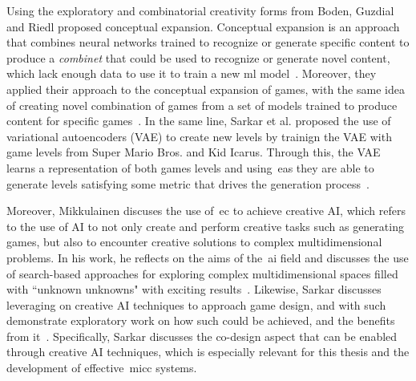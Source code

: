 Using the exploratory and combinatorial creativity forms from Boden, Guzdial and Riedl proposed conceptual expansion. Conceptual expansion is an approach that combines neural networks trained to recognize or generate specific content to produce a \textit{combinet} that could be used to recognize or generate novel content, which lack enough data to use it to train a new ml model~\cite{guzdial2018-combinets}. Moreover, they applied their approach to the conceptual expansion of games, with the same idea of creating novel combination of games from a set of models trained to produce content for specific games~\cite{guzdial2020-conceptualGameExpansion}. In the same line, Sarkar et al. proposed the use of variational autoencoders (VAE) to create new levels by trainign the VAE with game levels from Super Mario Bros. and Kid Icarus. Through this, the VAE learns a representation of both games levels and using~\acrshort{ea}s they are able to generate levels satisfying some metric that drives the generation process~\cite{sarkar2019-controllableLvlBlending}.

Moreover, Mikkulainen discuses the use of~\acrlong{ec} to achieve creative AI, which refers to the use of AI to not only create and perform creative tasks such as generating games, but also to encounter creative solutions to complex multidimensional problems. In his work, he reflects on the aims of the~\acrshort{ai} field and discusses the use of search-based approaches for exploring complex multidimensional spaces filled with ``unknown unknowns" with exciting results~\cite{miikkulainen2020-creativeAIEVO}. Likewise, Sarkar discusses leveraging on creative AI techniques to approach game design, and with such demonstrate exploratory work on how such could be achieved, and the benefits from it~\cite{sarkar2019-GameDesignCreativeAI}. Specifically, Sarkar discusses the co-design aspect that can be enabled through creative AI techniques, which is especially relevant for this thesis and the development of effective~\acrshort{micc} systems.





